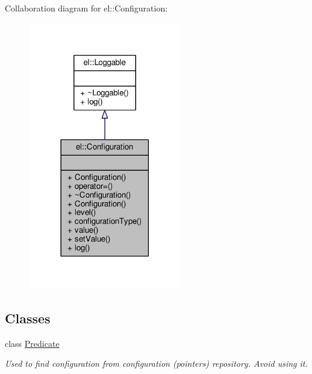 Collaboration diagram for el\+:\+:Configuration\+:
\nopagebreak
\begin{figure}[H]
\begin{center}
\leavevmode
\includegraphics[width=189pt]{da/d87/classel_1_1Configuration__coll__graph}
\end{center}
\end{figure}
\subsection*{Classes}
\begin{DoxyCompactItemize}
\item 
class \hyperlink{classel_1_1Configuration_1_1Predicate}{Predicate}
\begin{DoxyCompactList}\small\item\em Used to find configuration from configuration (pointers) repository. Avoid using it. \end{DoxyCompactList}\end{DoxyCompactItemize}
